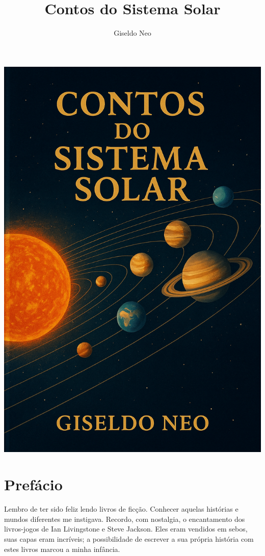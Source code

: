 \documentclass[a4paper,14pt]{book}
\title{\Huge Contos do Sistema Solar}
\author{Giseldo Neo}
\begin{document}
\includegraphics[width=\textwidth,height=\textheight,keepaspectratio]{img/capa.png}
\restoregeometry


\LARGE

\chapter*{Prefácio}

Lembro de ter sido feliz lendo livros de ficção. Conhecer aquelas histórias e mundos diferentes me instigava. Recordo, com nostalgia, o encantamento dos livros-jogos de Ian Livingstone e Steve Jackson. Eles eram vendidos em sebos, suas capas eram incríveis; a possibilidade de escrever a sua própria história com estes livros marcou a minha infância.
\end{document}
